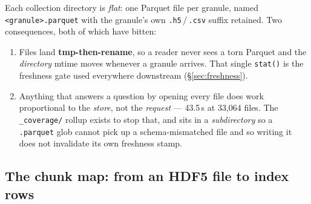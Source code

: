 \documentclass[11pt,a4paper]{article}
\newcommand{\code}[1]{\texttt{\small #1}}
\begin{document}
\begin{center}
\end{center}

\noindent
Each collection directory is \emph{flat}: one Parquet file per granule, named \code{<granule>.parquet} with
the granule's own \code{.h5}\,/\,\code{.csv} suffix retained. Two consequences, both of which have bitten:

\begin{enumerate}\setlength{\itemsep}{2pt}
\item Files land \textbf{tmp-then-rename}, so a reader never sees a torn Parquet and the \emph{directory}
  mtime moves whenever a granule arrives. That single \code{stat()} is the freshness gate used everywhere
  downstream (\S\ref{sec:freshness}).
\item Anything that answers a question by opening every file does work proportional to the \emph{store}, not
  the \emph{request} --- 43.5\,s at 33{,}064 files. The \code{\_coverage/} rollup exists to stop that, and
  sits in a \emph{subdirectory} so a \code{*.parquet} glob cannot pick up a schema-mismatched file and so
  writing it does not invalidate its own freshness stamp.
\end{enumerate}

\subsection{The chunk map: from an HDF5 file to index rows}
\label{sec:chunkmap}
\end{document}
